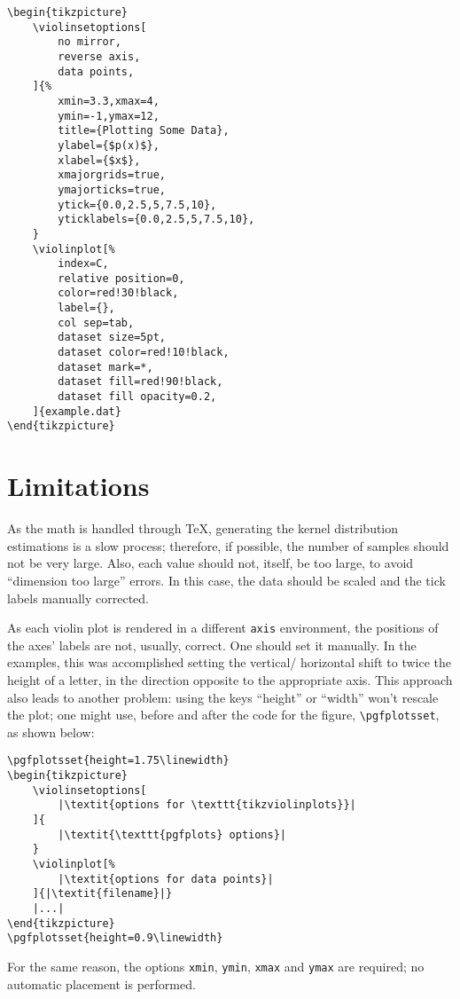 \documentclass{article}
\begin{document}

\begin{verbatim}
\begin{tikzpicture}
	\violinsetoptions[
		no mirror,
		reverse axis,
		data points,
	]{%
		xmin=3.3,xmax=4,
		ymin=-1,ymax=12,
		title={Plotting Some Data},
		ylabel={$p(x)$},
		xlabel={$x$},
		xmajorgrids=true,
		ymajorticks=true,
		ytick={0.0,2.5,5,7.5,10},
		yticklabels={0.0,2.5,5,7.5,10},
	}
	\violinplot[%
		index=C,
		relative position=0,
		color=red!30!black,
		label={},
		col sep=tab,
		dataset size=5pt,
		dataset color=red!10!black,
		dataset mark=*,
		dataset fill=red!90!black,
		dataset fill opacity=0.2,
	]{example.dat}
\end{tikzpicture}
\end{verbatim}

\section{Limitations}

As the math is handled through \TeX, generating the kernel distribution
estimations is a slow process; therefore, if possible, the number of samples
should not be very large. Also, each value should not, itself, be too large,
to avoid ``dimension too large'' errors. In this case, the data should be scaled
and the tick labels manually corrected.

As each violin plot is rendered in a different \texttt{axis} environment,
the positions of the axes' labels are not, usually, correct. One should
set it manually. In the examples, this was accomplished setting the vertical/
horizontal shift to twice the height of a letter, in the direction opposite
to the appropriate axis. This approach also leads to another problem: using the
keys ``height'' or ``width'' won't rescale the plot; one might use, before and
after the code for the figure, \texttt{\textbackslash pgfplotsset}, as shown below:


\begin{verbatim}
\pgfplotsset{height=1.75\linewidth}
\begin{tikzpicture}
	\violinsetoptions[
		|\textit{options for \texttt{tikzviolinplots}}|
	]{
		|\textit{\texttt{pgfplots} options}|
	}
	\violinplot[%
		|\textit{options for data points}|
	]{|\textit{filename}|}
	|...|
\end{tikzpicture}
\pgfplotsset{height=0.9\linewidth}
\end{verbatim}

For the same reason, the options \texttt{xmin}, \texttt{ymin}, \texttt{xmax}
and \texttt{ymax} are required; no automatic placement is performed.
\end{document}
